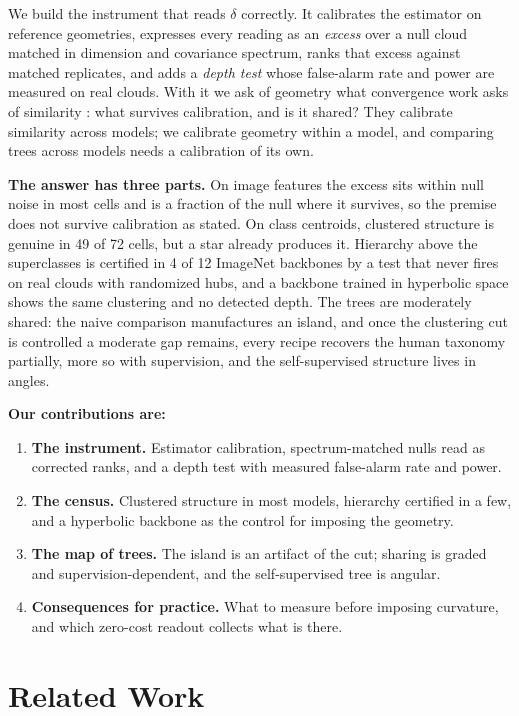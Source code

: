 \documentclass{article} %
\begin{document}
We build the instrument that reads $\delta$ correctly. It calibrates the estimator on reference geometries, expresses every reading as an \emph{excess} over a null cloud matched in dimension and covariance spectrum, ranks that excess against matched replicates, and adds a \emph{depth test} whose false-alarm rate and power are measured on real clouds. With it we ask of geometry what convergence work asks of similarity \citep{huh2024platonic, groger2026aristotelian}: what survives calibration, and is it shared? They calibrate similarity across models; we calibrate geometry within a model, and comparing trees across models needs a calibration of its own.

\textbf{The answer has three parts.} On image features the excess sits within null noise in most cells and is a fraction of the null where it survives, so the premise does not survive calibration as stated. On class centroids, clustered structure is genuine in 49 of 72 cells, but a star already produces it. Hierarchy above the superclasses is certified in 4 of 12 ImageNet backbones by a test that never fires on real clouds with randomized hubs, and a backbone trained in hyperbolic space shows the same clustering and no detected depth. The trees are moderately shared: the naive comparison manufactures an island, and once the clustering cut is controlled a moderate gap remains, every recipe recovers the human taxonomy partially, more so with supervision, and the self-supervised structure lives in angles.

\textbf{Our contributions are:}
\begin{enumerate}[topsep=0pt,itemsep=1pt,leftmargin=*]
\item \textbf{The instrument.} Estimator calibration, spectrum-matched nulls read as corrected ranks, and a depth test with measured false-alarm rate and power.
\item \textbf{The census.} Clustered structure in most models, hierarchy certified in a few, and a hyperbolic backbone as the control for imposing the geometry.
\item \textbf{The map of trees.} The island is an artifact of the cut; sharing is graded and supervision-dependent, and the self-supervised tree is angular.
\item \textbf{Consequences for practice.} What to measure before imposing curvature, and which zero-cost readout collects what is there.
\end{enumerate}

\section{Related Work}
\label{sec:related}
\end{document}
